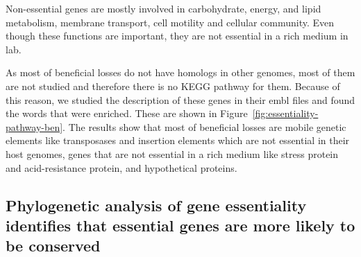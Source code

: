 \documentclass[12pt,letterpaper]{article}
\begin{document}
Non-essential genes are mostly involved in carbohydrate, energy, and lipid metabolism, membrane transport, cell motility and cellular community. Even though these functions are important, they are not essential in a rich medium in lab.

As most of beneficial losses do not have homologs in other genomes, most of them are not studied and therefore there is no KEGG pathway for them. Because of this reason, we studied the description of these genes in their embl files and found the words that were enriched. These are shown in Figure~\ref{fig:essentiality-pathway-ben}. The results show that most of beneficial losses are mobile genetic elements like transposases and insertion elements which are not essential in their host genomes, genes that are not essential in a rich medium like stress protein and acid-resistance protein, and hypothetical proteins.

\subsection{Phylogenetic analysis of gene essentiality identifies that essential genes are more likely to be conserved}
\end{document}
